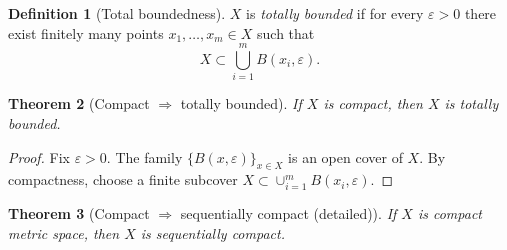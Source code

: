 \documentclass[11pt]{article}
\newtheorem{theorem}{Theorem}[section]
\theoremstyle{definition}
\newtheorem{definition}[theorem]{Definition}
\newcommand{\eps}{\varepsilon}
\begin{document}
\begin{definition}[Total boundedness]
$X$ is \emph{totally bounded} if for every $\eps>0$ there exist finitely many points $x_1,\dots,x_m\in X$ such that
\[
X\subset \bigcup_{i=1}^m B(x_i,\eps).
\]
\end{definition}

\begin{theorem}[Compact $\Rightarrow$ totally bounded]
If $X$ is compact, then $X$ is totally bounded.
\end{theorem}

\begin{proof}
Fix $\eps>0$. The family $\{B(x,\eps)\}_{x\in X}$ is an open cover of $X$.
By compactness, choose a finite subcover $X\subset\cup_{i=1}^m B(x_i,\eps)$.
\end{proof}

\begin{theorem}[Compact $\Rightarrow$ sequentially compact (detailed)]
If $X$ is compact metric space, then $X$ is sequentially compact.
\end{theorem}
\end{document}
